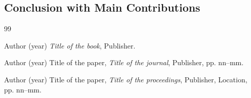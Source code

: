 \documentclass[a4paper,10.80pt,twoside]{article}
\begin{document}
\subsection{Conclusion with Main Contributions}

\begin{thebibliography}{99}

\bibitem{} Author (year) {\it Title of the book}, Publisher.

\bibitem{} Author (year) Title of the paper, {\it Title of the journal}, Publisher, pp. nn--mm.

\bibitem{} Author (year) Title of the paper, {\it Title of the proceedings}, Publisher, Location, pp. nn--mm.

\end{thebibliography}
\end{document}
